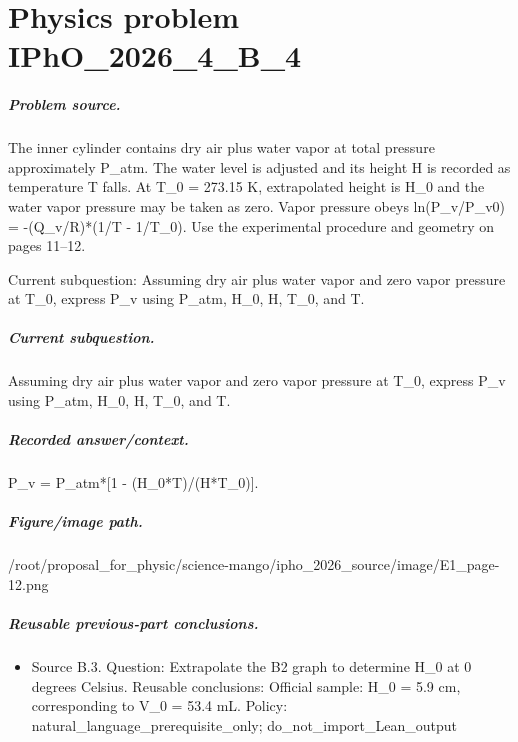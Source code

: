 
\chapter{Physics problem IPhO\_2026\_4\_B\_4}
\label{ch:IPhO2026Problems_problem_IPhO_2026_4_B_4}

\paragraph{Problem source.}
The inner cylinder contains dry air plus water vapor at total pressure
approximately P\_atm.  The water level is adjusted and its height H is recorded
as temperature T falls.  At T\_0 = 273.15 K, extrapolated height is H\_0 and the
water vapor pressure may be taken as zero.  Vapor pressure obeys
ln(P\_v/P\_v0) = -(Q\_v/R)*(1/T - 1/T\_0).  Use the experimental procedure and
geometry on pages 11--12.

Current subquestion:
Assuming dry air plus water vapor and zero vapor pressure at T\_0, express P\_v using P\_atm, H\_0, H, T\_0, and T.

\paragraph{Current subquestion.}
Assuming dry air plus water vapor and zero vapor pressure at T\_0, express P\_v using P\_atm, H\_0, H, T\_0, and T.

\paragraph{Recorded answer/context.}
P\_v = P\_atm*[1 - (H\_0*T)/(H*T\_0)].

\paragraph{Figure/image path.}
/root/proposal\_for\_physic/science-mango/ipho\_2026\_source/image/E1\_page-12.png

\paragraph{Reusable previous-part conclusions.}
\begin{itemize}
\item Source B.3. Question: Extrapolate the B2 graph to determine H\_0 at 0 degrees Celsius. Reusable conclusions: Official sample: H\_0 = 5.9 cm, corresponding to V\_0 = 53.4 mL. Policy: natural\_language\_prerequisite\_only; do\_not\_import\_Lean\_output
\end{itemize}

